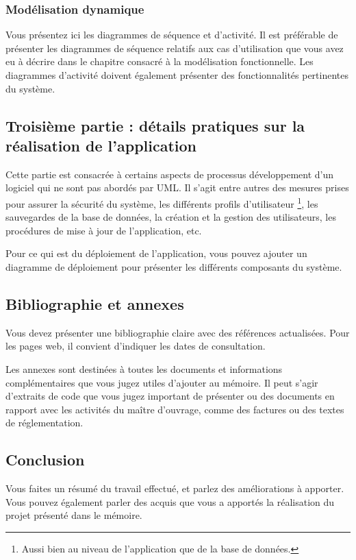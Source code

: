 \documentclass[12pt]{article}
\begin{document}
\subsubsection{Modélisation dynamique}
Vous présentez ici les diagrammes de séquence et d'activité. Il est préférable de présenter les diagrammes de séquence relatifs aux cas d'utilisation que vous avez eu à décrire dans le chapitre consacré à la modélisation fonctionnelle. Les diagrammes d'activité doivent également présenter des fonctionnalités pertinentes du système.

\subsection{Troisième partie : détails pratiques sur la réalisation de l'application}
Cette partie est consacrée à certains aspects de processus développement d'un logiciel qui ne sont pas abordés par UML. Il s'agit entre autres des mesures prises pour assurer la sécurité du système, les différents profils d'utilisateur \footnote{Aussi bien au niveau de l'application que de la base de données.}, les sauvegardes de la base de données, la création et la gestion des utilisateurs, les procédures de mise à jour de l'application, etc. 

Pour ce qui est du déploiement de l'application, vous pouvez ajouter un diagramme de déploiement pour présenter les différents composants du système.

\subsection{Bibliographie et annexes}
Vous devez présenter une bibliographie claire avec des références actualisées. Pour les pages web, il convient d'indiquer les dates de consultation.

Les annexes sont destinées à toutes les documents et informations complémentaires que vous jugez utiles d'ajouter au mémoire. Il peut s'agir d'extraits de code que vous jugez important de présenter ou des documents en rapport avec les activités du maître d'ouvrage, comme des factures ou des textes de réglementation.
\subsection{Conclusion}
Vous faites un résumé du travail effectué, et parlez des améliorations à apporter. Vous pouvez également parler des acquis que vous a apportés la réalisation du projet présenté dans le mémoire.
\end{document}

